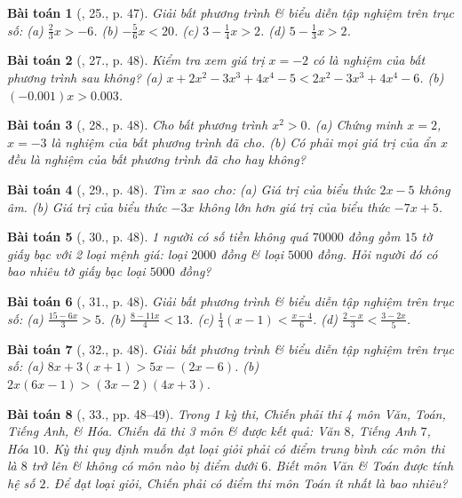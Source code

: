 \documentclass{article}
\newtheorem{baitoan}{Bài toán}
\begin{document}
\begin{baitoan}[\cite{SGK_Toan_8_tap_2}, 25., p. 47]
	Giải bất phương trình \& biểu diễn tập nghiệm trên trục số: (a) $\frac{2}{3}x > -6$. (b) $-\frac{5}{6}x < 20$. (c) $3 - \frac{1}{4}x > 2$. (d) $5 - \frac{1}{3}x > 2$.
\end{baitoan}

\begin{baitoan}[\cite{SGK_Toan_8_tap_2}, 27., p. 48]
	Kiểm tra xem giá trị $x = -2$ có là nghiệm của bất phương trình sau không? (a) $x + 2x^2 - 3x^3 + 4x^4 - 5 < 2x^2 - 3x^3 + 4x^4 - 6$. (b) $(-0.001)x > 0.003$.
\end{baitoan}

\begin{baitoan}[\cite{SGK_Toan_8_tap_2}, 28., p. 48]
	Cho bất phương trình $x^2 > 0$. (a) Chứng minh $x = 2$, $x = -3$ là nghiệm của bất phương trình đã cho. (b) Có phải mọi giá trị của ẩn $x$ đều là nghiệm của bất phương trình đã cho hay không?
\end{baitoan}

\begin{baitoan}[\cite{SGK_Toan_8_tap_2}, 29., p. 48]
	Tìm $x$ sao cho: (a) Giá trị của biểu thức $2x - 5$ không âm. (b) Giá trị của biểu thức $-3x$ không lớn hơn giá trị của biểu thức $-7x + 5$.
\end{baitoan}

\begin{baitoan}[\cite{SGK_Toan_8_tap_2}, 30., p. 48]
	1 người có số tiền không quá $70000$ đồng gồm $15$ tờ giấy bạc với 2 loại mệnh giá: loại $2000$ đồng \& loại $5000$ đồng. Hỏi người đó có bao nhiêu tờ giấy bạc loại $5000$ đồng?
\end{baitoan}

\begin{baitoan}[\cite{SGK_Toan_8_tap_2}, 31., p. 48]
	Giải bất phương trình \& biểu diễn tập nghiệm trên trục số: (a) $\frac{15 - 6x}{3} > 5$. (b) $\frac{8 - 11x}{4} < 13$. (c) $\frac{1}{4}(x - 1) < \frac{x - 4}{6}$. (d) $\frac{2 - x}{3} < \frac{3 - 2x}{5}$.
\end{baitoan}

\begin{baitoan}[\cite{SGK_Toan_8_tap_2}, 32., p. 48]
	Giải bất phương trình \& biểu diễn tập nghiệm trên trục số: (a) $8x + 3(x + 1) > 5x - (2x - 6)$.  (b) $2x(6x - 1) > (3x - 2)(4x + 3)$.
\end{baitoan}

\begin{baitoan}[\cite{SGK_Toan_8_tap_2}, 33., pp. 48--49]
	Trong 1 kỳ thi, Chiến phải thi 4 môn Văn, Toán, Tiếng Anh, \& Hóa. Chiến đã thi 3 môn \& được kết quả: Văn $8$, Tiếng Anh $7$, Hóa $10$. Kỳ thi quy định muốn đạt loại giỏi phải có điểm trung bình các môn thi là $8$ trở lên \& không có môn nào bị điểm dưới $6$. Biết môn Văn \& Toán được tính hệ số $2$. Để đạt loại giỏi, Chiến phải có điểm thi môn Toán ít nhất là bao nhiêu?
\end{baitoan}
\end{document}
